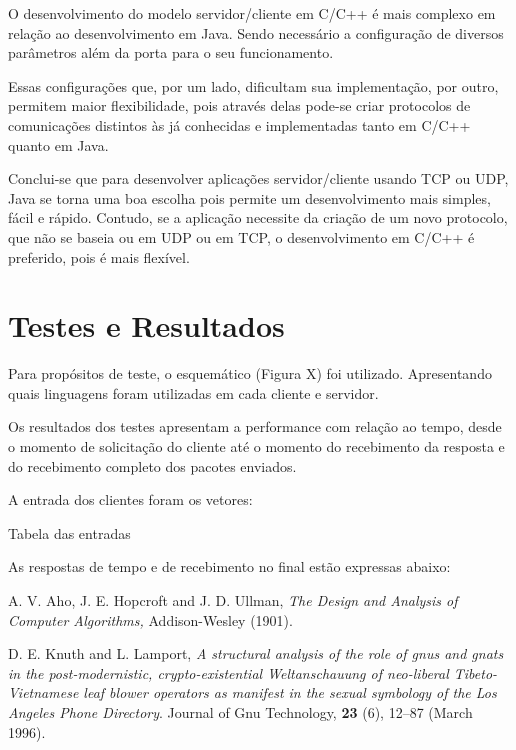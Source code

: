 \documentclass[11pt,twoside]{article}
\begin{document}
O desenvolvimento do modelo servidor/cliente em C/C++ é mais complexo em relação ao desenvolvimento em Java. Sendo necessário a configuração de diversos parâmetros além da porta para o seu funcionamento.

Essas configurações que, por um lado, dificultam sua implementação, por outro, permitem maior flexibilidade, pois através delas pode-se criar protocolos de comunicações distintos às já conhecidas e implementadas tanto em C/C++ quanto em Java.

Conclui-se que para desenvolver aplicações servidor/cliente usando TCP ou UDP, Java se torna uma boa escolha pois permite um desenvolvimento mais simples, fácil e rápido. Contudo, se a aplicação necessite da criação de um novo protocolo, que não se baseia ou em UDP ou em TCP, o desenvolvimento em C/C++ é preferido, pois é mais flexível.
\newpage
\section{Testes e Resultados}
Para propósitos de teste, o esquemático (Figura X) foi utilizado. Apresentando quais linguagens foram utilizadas em cada cliente e servidor.

Os resultados dos testes apresentam a performance com relação ao tempo, desde o momento de solicitação do cliente até o momento do recebimento da resposta e do recebimento completo dos pacotes enviados.

A entrada dos clientes foram os vetores:

Tabela das entradas

As respostas de tempo e de recebimento no final estão expressas abaixo:





\newpage
\begin{thebibliography}{99}

 A. V. Aho, J. E. Hopcroft and J.  D.  Ullman, {\it The
Design and Analysis of Computer Algorithms,} Addison-Wesley (1901).

 D. E. Knuth and L. Lamport, {\it A structural analysis
of the role of gnus and gnats in the post-modernistic, crypto-existential 
Weltanschauung of neo-liberal Tibeto-Vietnamese leaf blower operators 
as manifest in the sexual symbology of the Los Angeles Phone Directory}.
Journal of Gnu Technology, {\bf 23} (6), 12--87
(March 1996).

\end{thebibliography}
\end{document}
